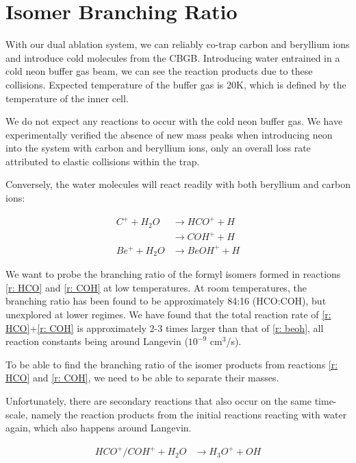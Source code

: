 \section{Isomer Branching Ratio}

With our dual ablation system, we can reliably co-trap carbon and beryllium ions and introduce cold molecules from the CBGB. Introducing water entrained in a cold neon buffer gas beam, we can see the reaction products due to these collisions. Expected temperature of the buffer gas is 20K, which is defined by the temperature of the inner cell.

We do not expect any reactions to occur with the cold neon buffer gas. We have experimentally verified the absence of new mass peaks when introducing neon into the system with carbon and beryllium ions, only an overall loss rate attributed to elastic collisions within the trap.

Conversely, the water molecules will react readily with both beryllium and carbon ions:

\begin{align}
	C^+ +H_2O & \rightarrow HCO^+ + H \label{r: HCO} \\
	& \rightarrow COH^+ + H \label{r: COH} \\
	Be^+ + H_2O & \rightarrow BeOH^+ + H  \label{r: beoh}
\end{align}

We want to probe the branching ratio of the formyl isomers formed in reactions \ref{r: HCO} and \ref{r: COH} at low temperatures. At room temperatures, the branching ratio has been found to be approximately 84:16 (HCO:COH)\cite{Freeman1987}, but unexplored at lower regimes. We have found that the total reaction rate of \ref{r: HCO}+\ref{r: COH} is approximately 2-3 times larger than that of \ref{r: beoh}, all reaction constants being around Langevin ($10^{-9}$ cm$^3$/s).

To be able to find the branching ratio of the isomer products from reactions \ref{r: HCO} and \ref{r: COH}, we need to be able to separate their masses. 

Unfortunately, there are secondary reactions that also occur on the same time-scale, namely the reaction products from the initial reactions reacting with water again, which also happens around Langevin.

\begin{align}
	HCO^+/COH^+ + H_2O &\rightarrow H_3O^+ + OH \label{r: c2}
\end{align}

